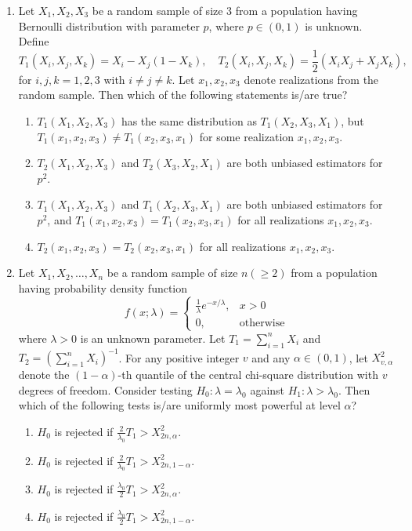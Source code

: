 \documentclass[journal,12pt,onecolumn]{IEEEtran}
\theoremstyle{remark}
\begin{document}
\begin{enumerate}
    \item Let $X_1, X_2, X_3$ be a random sample of size 3 from a population having Bernoulli distribution with parameter $p$, where $p \in (0,1)$ is unknown. Define
\[
    T_1(X_i, X_j, X_k) = X_i - X_j(1 - X_k), \quad T_2(X_i, X_j, X_k) = \frac{1}{2} (X_i X_j + X_j X_k),
\]
    for $i, j, k = 1, 2, 3$ with $i \neq j \neq k$. Let $x_1, x_2, x_3$ denote realizations from the random sample. Then which of the following statements is/are true?
    \begin{enumerate}
        \item $T_1(X_1, X_2, X_3)$ has the same distribution as $T_1(X_2, X_3, X_1)$, but $T_1(x_1, x_2, x_3) \neq T_1(x_2, x_3, x_1)$ for some realization $x_1, x_2, x_3$.
        \item $T_2(X_1, X_2, X_3)$ and $T_2(X_3, X_2, X_1)$ are both unbiased estimators for $p^2$.
        \item $T_1(X_1, X_2, X_3)$ and $T_1(X_2, X_3, X_1)$ are both unbiased estimators for $p^2$, and $T_1(x_1, x_2, x_3) = T_1(x_2, x_3, x_1)$ for all realizations $x_1, x_2, x_3$.
        \item $T_2(x_1, x_2, x_3) = T_2(x_2, x_3, x_1)$ for all realizations $x_1, x_2, x_3$.
    \end{enumerate}

    \item Let $X_1, X_2, \dots, X_n$ be a random sample of size $n (\geq 2)$ from a population having probability density function
\[
    f(x; \lambda) = \begin{cases} 
        \frac{1}{\lambda} e^{-x/\lambda}, & x > 0 \\ 
        0, & \text{otherwise} 
    \end{cases}
\]
    where $\lambda > 0$ is an unknown parameter. Let $T_1 = \sum_{i=1}^{n} X_i$ and $T_2 = \left(\sum_{i=1}^{n} X_i\right)^{-1}$. For any positive integer $v$ and any $\alpha \in (0, 1)$, let $X_{v,\alpha}^2$ denote the $(1 - \alpha)$-th quantile of the central chi-square distribution with $v$ degrees of freedom. Consider testing $H_0: \lambda = \lambda_0$ against $H_1: \lambda > \lambda_0$. Then which of the following tests is/are uniformly most powerful at level $\alpha$?
    \begin{enumerate}
        \item $H_0$ is rejected if $\frac{2}{\lambda_0}T_1  > X_{2n, \alpha}^2$.
        \item $H_0$ is rejected if $\frac{2}{\lambda_0}T_1> X_{2n, 1 - \alpha}^2$.
        \item $H_0$ is rejected if $\frac{\lambda_0}{2}T_1 > X_{2n, \alpha}^2$.
        \item $H_0$ is rejected if $\frac{\lambda_0}{2}T_1> X_{2n, 1 - \alpha}^2$.
    \end{enumerate}


\end{enumerate}
\end{document}
